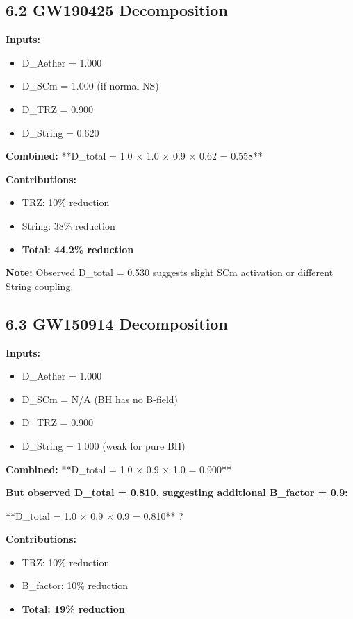\documentclass[11pt]{article}
\begin{document}
\subsection*{6.2 GW190425 Decomposition}

\textbf{Inputs:}

\begin{itemize}
  \item D\_Aether = 1.000
  \item D\_SCm = 1.000 (if normal NS)
  \item D\_TRZ = 0.900
  \item D\_String = 0.620
\end{itemize}

\textbf{Combined:} **D\_total = 1.0 $\times$ 1.0 $\times$ 0.9 $\times$ 0.62 = 0.558**

\textbf{Contributions:}

\begin{itemize}
  \item TRZ: 10\% reduction
  \item String: 38\% reduction
  \item \textbf{Total: 44.2\% reduction}
\end{itemize}

\textbf{Note:} Observed D\_total = 0.530 suggests slight SCm activation or different String coupling.

\subsection*{6.3 GW150914 Decomposition}

\textbf{Inputs:}

\begin{itemize}
  \item D\_Aether = 1.000
  \item D\_SCm = N/A (BH has no B-field)
  \item D\_TRZ = 0.900
  \item D\_String = 1.000 (weak for pure BH)
\end{itemize}

\textbf{Combined:} **D\_total = 1.0 $\times$ 0.9 $\times$ 1.0 = 0.900**

\textbf{But observed D\_total = 0.810, suggesting additional B\_factor = 0.9:}

**D\_total = 1.0 $\times$ 0.9 $\times$ 0.9 = 0.810** ?

\textbf{Contributions:}

\begin{itemize}
  \item TRZ: 10\% reduction
  \item B\_factor: 10\% reduction
  \item \textbf{Total: 19\% reduction}
\end{itemize}
\end{document}
